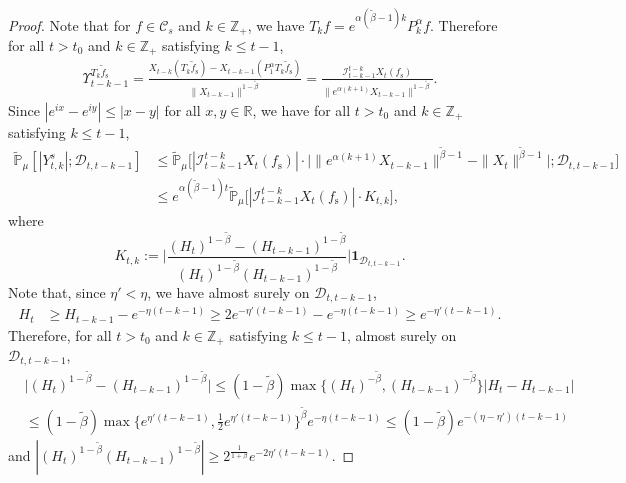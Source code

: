 \documentclass[12pt,a4paper]{amsart}
\theoremstyle{plain}
\theoremstyle{definition}
\numberwithin{equation}{section}
\begin{document}
\begin{proof}
  Note that for $f\in \mathcal C_s$ and $k\in \mathbb Z_+$, we have $T_kf = e^{\alpha (\tilde \beta - 1 )k}P_k^\alpha f $. Therefore for all $t>t_0$ and $k\in \mathbb Z_+$ satisfying $k\leq t-1$,
  \begin{align}
    \label{eq:gammafunction11}
    \Upsilon_{t-k-1}^{T_{k} \tilde f_\mathrm s}
    = \frac{X_{t-k}(T_{k} \tilde  f_\mathrm s) - X_{t -k-1}(P_1^\alpha T_{k} \tilde f_\mathrm s)}{\|X_{t-k-1}\|^{1-\tilde \beta}}
    = \frac{\mathcal I_{t - k - 1}^{t - k} X_t(f_\mathrm s)}{\|e^{\alpha (k+1)}X_{t-k-1} \|^{1 -\tilde \beta}}.
  \end{align}
  Since $|e^{ix}-e^{iy}|\leq|x-y|$ for all $x,y\in \mathbb R$, we have  for all $t>t_0$ and $k\in \mathbb Z_+$ satisfying $k\leq t-1$,
  \begin{align}
    \label{eq: control of Ykt}
    \mathbb{\widetilde{P}}_{\mu}[|Y^s_{t,k}|;\mathcal{D}_{t,t-k-1}]
    & \leq \mathbb{\widetilde{P}}_{\mu}\Big[|\mathcal I_{t-k-1}^{t-k} X_t(f_\mathrm s) | \cdot \Big| \| e^{\alpha(k+1)}X_{t-k-1}\| ^{ \tilde \beta - 1} - \|X_t\|^{ \tilde \beta - 1}\Big|; \mathcal D_{t,t-k-1}\Big] \\
    & \leq  e^{\alpha(\tilde \beta - 1)t}\mathbb{\widetilde{P}}_{\mu}\big[|\mathcal I_{t-k-1}^{t-k}X_t(f_\mathrm s)|\cdot K_{t,k}\big],
  \end{align}
  where
  \[
    K_{t,k}
   := \Big| \frac {(H_t)^{1- \tilde \beta} - (H_{t-k-1})^{1 - \tilde \beta}} {(H_t)^{1 - \tilde \beta}
   (H_{t-k-1})^{ 1- \tilde \beta }} \Big| \mathbf{1}_{\mathcal{D}_{t,t-k-1}}.
  \]
  Note that, since $\eta' < \eta$, we have almost surely on $\mathcal D_{t,t-k-1}$,
  \begin{align}
    H_t
    & \geq H_{t-k-1}- e^{-\eta (t-k-1)}
      \geq 2e^{-\eta'(t-k-1)}-e^{-\eta(t-k-1)}
      \geq e^{-\eta'(t-k-1)}.
  \end{align}
  Therefore, for all $t>t_0$ and $k\in \mathbb Z_+$ satisfying $k\leq t-1$, almost surely  on $\mathcal D_{t,t-k-1}$,
  \begin{align}
   & \Big|(H_t)^{1- \tilde \beta}-(H_{t-k-1})^{1- \tilde \beta}\Big|
      \leq (1- \tilde \beta) \max \{ (H_t)^{-\tilde \beta }, (H_{t-k-1})^{ -\tilde \beta} \} | H_t - H_{t-k-1} | \\
    & \leq (1- \tilde \beta ) \max\{e^{\eta' (t-k-1)}, \frac{1}{2}e^{\eta'(t-k-1)}\}^{\tilde \beta} e^{-\eta(t-k-1)}  \leq (1- \tilde \beta) e^{-(\eta - \eta') (t-k-1)}
  \end{align}
  and $ |(H_t)^{1 - \tilde \beta} (H_{t-k-1})^{ 1 - \tilde \beta}| \geq 2^{\frac{1}{1+\beta}} e^{-2\eta'(t-k-1)}$.

\end{proof}
\end{document}
